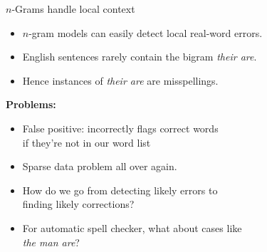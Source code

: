 \documentclass[professionalfonts, xcolor={usenames,svgnames,x11names,table}]{beamer}
\begin{document}
\begin{frame}{$n$-Grams handle local context}
    \begin{itemize}
        \item $n$-gram models can easily detect local real-word errors.
    \end{itemize}
    \begin{example}
        \begin{itemize}
            \item English sentences rarely contain the bigram \emph{their are}.
            \item Hence instances of \emph{their are} are misspellings.
        \end{itemize}
    \end{example}
    \pause
    \textbf{Problems:}
    \begin{itemize}
        \item False positive: incorrectly flags correct words\\
              if they're not in our word list
        \item Sparse data problem all over again.
        \item How do we go from detecting likely errors to\\
              finding likely corrections?
        \item For automatic spell checker, what about cases like\\
              \emph{the man are}?\\
    \end{itemize}
\end{frame}
\end{document}
